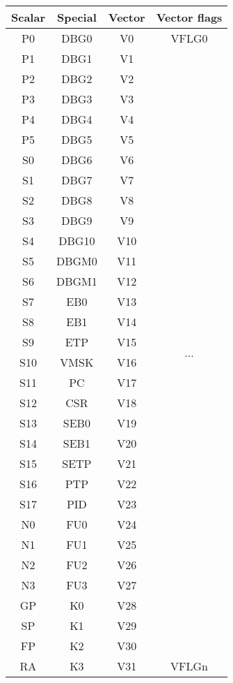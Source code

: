 \begin{table}[hbt!] %

    \begin{center}

    \begin{tabular}{|c|c|c|c|}

        \hline
        Scalar & Special & Vector & Vector flags \\
        \hline
        P0 & DBG0 & V0 & VFLG0 \\
        \hline
        P1 & DBG1 & V1 & \multirow{30}{*}{...} \\
        \cline{1-3}
        P2 & DBG2 & V2 & \\
        \cline{1-3}
        P3 & DBG3 & V3 & \\
        \cline{1-3}
        P4 & DBG4 & V4 & \\
        \cline{1-3}
        P5 & DBG5 & V5 & \\
        \cline{1-3}
        S0 & DBG6 & V6 & \\
        \cline{1-3}
        S1 & DBG7 & V7 & \\
        \cline{1-3}
        S2 & DBG8 & V8 & \\
        \cline{1-3}
        S3 & DBG9 & V9 & \\
        \cline{1-3}
        S4 & DBG10 & V10 & \\
        \cline{1-3}
        S5 & DBGM0 & V11 & \\
        \cline{1-3}
        S6 & DBGM1 & V12 & \\
        \cline{1-3}
        S7 & EB0 & V13 & \\
        \cline{1-3}
        S8 & EB1 & V14 & \\
        \cline{1-3}
        S9 & ETP & V15 & \\
        \cline{1-3}
        S10 & VMSK & V16 & \\
        \cline{1-3}
        S11 & PC & V17 & \\
        \cline{1-3}
        S12 & CSR & V18 & \\
        \cline{1-3}
        S13 & SEB0 & V19 & \\
        \cline{1-3}
        S14 & SEB1 & V20 & \\
        \cline{1-3}
        S15 & SETP & V21 & \\
        \cline{1-3}
        S16 & PTP & V22 & \\
        \cline{1-3}
        S17 & PID & V23 & \\
        \cline{1-3}
        N0 & FU0 & V24 & \\
        \cline{1-3}
        N1 & FU1 & V25 & \\
        \cline{1-3}
        N2 & FU2 & V26 & \\
        \cline{1-3}
        N3 & FU3 & V27 & \\
        \cline{1-3}
        GP & K0 & V28 & \\
        \cline{1-3}
        SP & K1 & V29 & \\
        \cline{1-3}
        FP & K2 & V30 & \\
        \hline
        RA & K3 & V31 & VFLGn\\
        \hline


\end{tabular}
\end{center}
\end{table}
